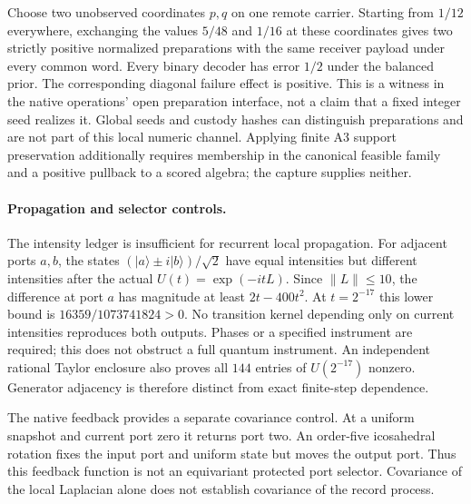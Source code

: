 Choose two unobserved coordinates $p,q$ on one remote carrier. Starting
from $1/12$ everywhere, exchanging the values $5/48$ and $1/16$ at these
coordinates gives two strictly positive normalized preparations with the
same receiver payload under every common word. Every binary decoder has
error $1/2$ under the balanced prior. The corresponding diagonal failure
effect is positive. This is a witness in the native operations' open
preparation interface, not a claim that a fixed integer seed realizes it.
Global seeds and custody hashes can distinguish preparations and are not
part of this local numeric channel. Applying finite A3 support preservation
additionally requires membership in the canonical feasible family and a
positive pullback to a scored algebra; the capture supplies neither.

\paragraph{Propagation and selector controls.}
The intensity ledger is insufficient for recurrent local propagation.
For adjacent ports $a,b$, the states $(|a\rangle\pm i|b\rangle)/\sqrt2$
have equal intensities but different intensities after the actual
$U(t)=\exp(-itL)$. Since $\|L\|\leq10$, the difference at port $a$ has
magnitude at least $2t-400t^2$. At $t=2^{-17}$ this lower bound is
$16359/1073741824>0$. No transition kernel depending only on current
intensities reproduces both outputs. Phases or a specified instrument
are required; this does not obstruct a full quantum instrument.
An independent rational Taylor enclosure also proves all $144$ entries
of $U(2^{-17})$ nonzero. Generator adjacency is therefore distinct from
exact finite-step dependence.

The native feedback provides a separate covariance control. At a uniform
snapshot and current port zero it returns port two. An order-five
icosahedral rotation fixes the input port and uniform state but moves the
output port. Thus this feedback function is not an equivariant protected
port selector. Covariance of the local Laplacian alone does not establish
covariance of the record process.

